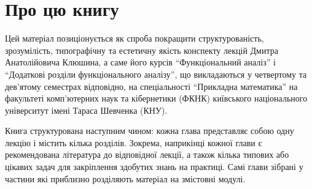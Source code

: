 \section*{Про цю книгу}

Цей матеріал позиціонується як спроба покращити
структурованість, зрозумілість,
типографічну та естетичну якість
конспекту лекцій
Дмитра Анатолійовича Клюшина,
а саме його курсів ``Функціональний аналіз''
і ``Додаткові розділи функціонального аналізу'',
що викладаються у четвертому та дев'ятому семестрах відповідно,
на спеціальності ``Прикладна математика''
на факультеті комп'ютерних наук та кібернетики (ФКНК)
київського національного університут імені Тараса Шевченка (КНУ).

Книга структурована наступним чином:
кожна глава представляє собою одну лекцію
і містить кілька розділів.
Зокрема, наприкінці кожної глави
є рекомендована література до відповідної лекції,
а також кілька типових або цікавих задач
для закріплення здобутих знань на практиці.
Самі глави зібрані у частини
які приблизно розділяють матеріал на змістовні модулі.
